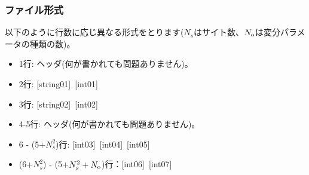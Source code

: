 \subsubsection{ファイル形式}
以下のように行数に応じ異なる形式をとります($N_s$はサイト数、$N_{\rm o}$は変分パラメータの種類の数)。
 \begin{itemize}
   \item  1行:  ヘッダ(何が書かれても問題ありません)。
   \item  2行:   [string01]~[int01]
   \item  3行:   [string02]~[int02]
   \item  4-5行:  ヘッダ(何が書かれても問題ありません)。
   \item  6 - (5+$N_s^2$)行: [int03]~[int04]~[int05]
   \item  (6+$N_s^2$) - (5+$N_s^2+N_{\rm o}$)行：[int06]~[int07]
  \end{itemize}
